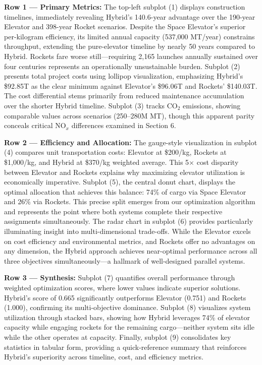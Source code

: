\documentclass[12pt]{article}
\begin{document}
\textbf{Row 1 --- Primary Metrics:} The top-left subplot (1) displays construction timelines, immediately revealing Hybrid's 140.6-year advantage over the 190-year Elevator and 398-year Rocket scenarios. Despite the Space Elevator's superior per-kilogram efficiency, its limited annual capacity (537,000 MT/year) constrains throughput, extending the pure-elevator timeline by nearly 50 years compared to Hybrid. Rockets fare worse still---requiring 2,165 launches annually sustained over four centuries represents an operationally unsustainable burden. Subplot (2) presents total project costs using lollipop visualization, emphasizing Hybrid's \$92.85T as the clear minimum against Elevator's \$96.06T and Rockets' \$140.03T. The cost differential stems primarily from reduced maintenance accumulation over the shorter Hybrid timeline. Subplot (3) tracks CO$_2$ emissions, showing comparable values across scenarios (250--280M MT), though this apparent parity conceals critical NO$_x$ differences examined in Section 6.

\textbf{Row 2 --- Efficiency and Allocation:} The gauge-style visualization in subplot (4) compares unit transportation costs: Elevator at \$200/kg, Rockets at \$1,000/kg, and Hybrid at \$370/kg weighted average. This 5$\times$ cost disparity between Elevator and Rockets explains why maximizing elevator utilization is economically imperative. Subplot (5), the central donut chart, displays the optimal allocation that achieves this balance: 74\% of cargo via Space Elevator and 26\% via Rockets. This precise split emerges from our optimization algorithm and represents the point where both systems complete their respective assignments simultaneously. The radar chart in subplot (6) provides particularly illuminating insight into multi-dimensional trade-offs. While the Elevator excels on cost efficiency and environmental metrics, and Rockets offer no advantages on any dimension, the Hybrid approach achieves near-optimal performance across all three objectives simultaneously---a hallmark of well-designed parallel systems.

\textbf{Row 3 --- Synthesis:} Subplot (7) quantifies overall performance through weighted optimization scores, where lower values indicate superior solutions. Hybrid's score of 0.665 significantly outperforms Elevator (0.751) and Rockets (1.000), confirming its multi-objective dominance. Subplot (8) visualizes system utilization through stacked bars, showing how Hybrid leverages 74\% of elevator capacity while engaging rockets for the remaining cargo---neither system sits idle while the other operates at capacity. Finally, subplot (9) consolidates key statistics in tabular form, providing a quick-reference summary that reinforces Hybrid's superiority across timeline, cost, and efficiency metrics.
\end{document}
